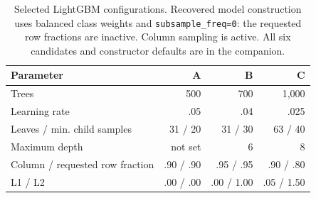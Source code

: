 \begin{table}[t]
\caption{Selected LightGBM configurations. Recovered model construction uses balanced class weights and \texttt{subsample\_freq=0}: the requested row fractions are inactive. Column sampling is active. All six candidates and constructor defaults are in the companion.}
\label{tab:config}
\centering\footnotesize
\setlength{\tabcolsep}{4pt}
\begin{tabular}{@{}lrrr@{}}
\toprule
Parameter & A & B & C \\
\midrule
Trees & 500 & 700 & 1,000 \\
Learning rate & .05 & .04 & .025 \\
Leaves / min. child samples & 31 / 20 & 31 / 30 & 63 / 40 \\
Maximum depth & not set & 6 & 8 \\
Column / requested row fraction & .90 / .90 & .95 / .95 & .90 / .80 \\
L1 / L2 & .00 / .00 & .00 / 1.00 & .05 / 1.50 \\
\bottomrule
\end{tabular}
\end{table}
